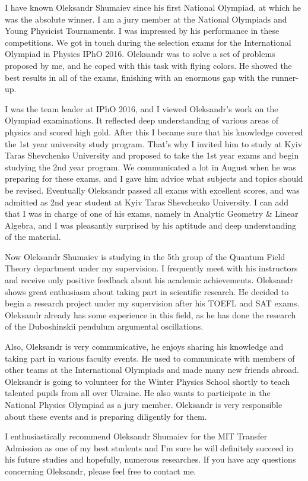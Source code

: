 \documentclass[12pt,a4paper]{article}
\begin{document}
 

I have known Oleksandr Shumaiev since his first National Olympiad, at which he was the absolute winner. I am a jury member at the National Olympiads and Young Physicist Tournaments. I was impressed by his performance in these competitions. We got in touch during the selection exams for the International Olympiad in Physics IPhO 2016. Oleksandr was to solve a set of problems proposed by me, and he coped with this task with flying colors. He showed the best results in all of the exams, finishing with an enormous gap with the runner-up. 

I was the team leader at IPhO 2016, and I viewed Oleksandr's work on the Olympiad examinations. It reflected deep understanding of various areas of physics and scored high gold. After this I became sure that his knowledge covered the 1st year university study program. That's why I invited him to study at Kyiv Taras Shevchenko University and proposed to take the 1st year exams and begin studying the 2nd year program. We communicated a lot in August when he was preparing for these exams, and I gave him advice what subjects and topics should be revised. Eventually Oleksandr passed all exams with excellent scores, and was admitted as 2nd year student at Kyiv Taras Shevchenko University. I can add that I was in charge of one of his exams, namely in Analytic Geometry \& Linear Algebra, and I was pleasantly surprised by his aptitude and deep understanding of the material.

Now Oleksandr Shumaiev is studying in the 5th group of the Quantum Field Theory department under my supervision. I frequently meet with his instructors and receive only positive feedback about his academic achievements. Oleksandr shows great enthusiasm about taking part in scientific research. He decided to begin a research project under my supervision after his TOEFL and SAT exams. Oleksandr already has some experience in this field, as he has done the research of the Duboshinskii pendulum argumental oscillations.

Also, Oleksandr is very communicative, he enjoys sharing his knowledge and taking part in various faculty events. He used to communicate with members of other teams at the International Olympiads and made many new friends abroad. Oleksandr is going to volunteer for the Winter Physics School shortly to teach talented pupils from all over Ukraine. He also wants to participate in the National Physics Olympiad as a jury member. Oleksandr is very responsible about these events and is preparing diligently for them.

I enthusiastically recommend Oleksandr Shumaiev for the MIT Transfer Admission as one of my best students and I'm sure he will definitely succeed in his future studies and hopefully, numerous researches. If you have any questions concerning Oleksandr, please feel free to contact me.
\end{document}
